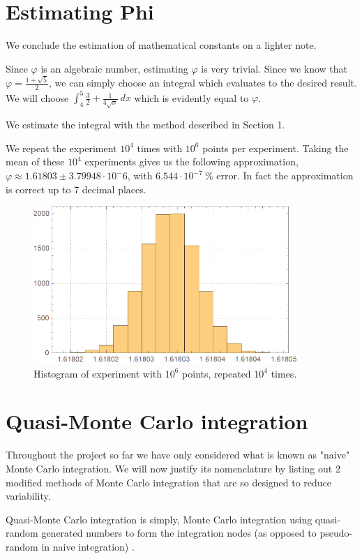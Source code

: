 \documentclass[12pt]{article}
\numberwithin{equation}{section}
\begin{document}
\section{Estimating Phi}
We conclude the estimation of mathematical constants on a lighter note.
\par Since $\varphi$ is an algebraic number, estimating $\varphi$ is very trivial. Since we know that $\varphi = \frac{1+\sqrt{5}}{2}$, we can simply choose an integral which evaluates to the desired result. We will choose $\int_4^5 \frac{3}{2}+\frac{1}{4 \sqrt{x}}\ dx$ which is evidently equal to $\varphi$.
\par We estimate the integral with the method described in Section 1.
\par We repeat the experiment $10^4$ times with $10^6$ points per experiment. Taking the mean of these $10^4$ experiments gives us the following approximation, $\varphi \approx 1.61803 \pm 3.79948 \cdot 10^-6$, with $6.544 \cdot 10^{-7}\ \%$ error. In fact the approximation is correct up to 7 decimal places.
\begin{figure}[!htb]
    \centering
    \includegraphics[width=10cm]{Images/repeatedphi.png}
    \caption{Histogram of experiment with $10^6$ points, repeated $10^4$ times.}
    \label{fig:repeatedphi}
\end{figure}
\section{Quasi-Monte Carlo integration}
Throughout the project so far we have only considered what is known as "naive" Monte Carlo integration. We will now justify its nomenclature by listing out 2 modified methods of Monte Carlo integration that are so designed to reduce variability.
\par
Quasi-Monte Carlo integration is simply, Monte Carlo integration using quasi-random generated numbers to form the integration nodes (as opposed to pseudo-random in naive integration) \cite{MOROKOFF1995218}.
\end{document}
